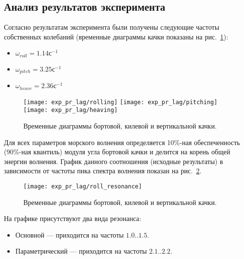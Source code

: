 \subsection{Анализ результатов эксперимента}

Согласно результатам эксперимента были получены следующие частоты собственных колебаний (временные диаграммы качки показаны на рис.~\ref{exp_pr_rolling_lag}):
\begin{itemize}
	\item	$ \omega_{roll} = 1.14 \text{с}^{-1}$
	\item	$ \omega_{pitch} = 3.25 \text{с}^{-1}$
	\item	$ \omega_{heave} = 2.36 \text{с}^{-1}$
\end{itemize}

\begin{figure}[ht]
	\begin{center}
	\texttt{[image: exp\_pr\_lag/rolling]}
	\texttt{[image: exp\_pr\_lag/pitching]}
	\texttt{[image: exp\_pr\_lag/heaving]}
	\end{center}
	\caption{Временные диаграммы бортовой, килевой и вертикальной качки.}
	\label{exp_pr_rolling_lag}
\end{figure}

Для всех параметров морского волнения определяется 10\%-ная обеспеченность (90\%-ная квантиль) модуля угла бортовой качки и делится на корень общей энергии волнения. График данного соотношения (исходные результаты) в зависимости от частоты пика спектра волнения показан на рис.~\ref{exp_pr_rolling_resonance_lag}.

\begin{figure}[ht]
	\begin{center}
	\texttt{[image: exp\_pr\_lag/roll\_resonance]}
	\end{center}
	\caption{Временные диаграммы бортовой, килевой и вертикальной качки.}
	\label{exp_pr_rolling_resonance_lag}
\end{figure}

На графике присутствуют два вида резонанса:
\begin{itemize}
	\item	Основной --- приходится на частоты $1.0..1.5$.
	\item	Параметрический --- приходится на частоты $2.1..2.2$.
\end{itemize}

